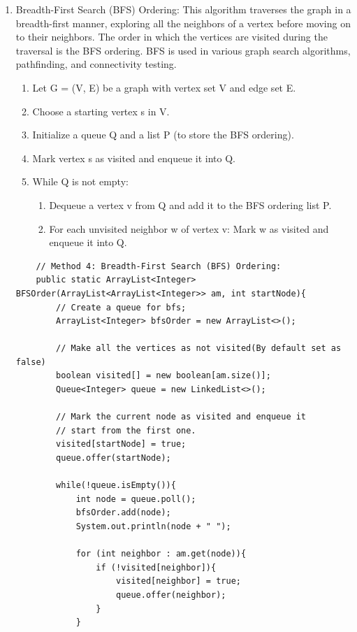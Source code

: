 \documentclass{article}
\begin{document}
\begin{enumerate}
\item Breadth-First Search (BFS) Ordering: This algorithm traverses the graph in a breadth-first manner, exploring all the neighbors of a vertex before moving on to their neighbors. The order in which the vertices are visited during the traversal is the BFS ordering. BFS is used in various graph search algorithms, pathfinding, and connectivity testing.\cite{BFS}
\begin{enumerate}
    \item Let G = (V, E) be a graph with vertex set V and edge set E.
\item Choose a starting vertex s in V.
\item Initialize a queue Q and a list P (to store the BFS ordering).
\item Mark vertex s as visited and enqueue it into Q.
\item While Q is not empty:
\begin{enumerate}
    \item Dequeue a vertex v from Q and add it to the BFS ordering list P.
    \item For each unvisited neighbor w of vertex v: Mark w as visited and enqueue it into Q.
\end{enumerate}


\end{enumerate}
    \begin{verbatim}
    // Method 4: Breadth-First Search (BFS) Ordering:
    public static ArrayList<Integer> BFSOrder(ArrayList<ArrayList<Integer>> am, int startNode){
        // Create a queue for bfs;
        ArrayList<Integer> bfsOrder = new ArrayList<>();

        // Make all the vertices as not visited(By default set as false)
        boolean visited[] = new boolean[am.size()];
        Queue<Integer> queue = new LinkedList<>();

        // Mark the current node as visited and enqueue it
        // start from the first one.
        visited[startNode] = true;
        queue.offer(startNode);

        while(!queue.isEmpty()){
            int node = queue.poll();
            bfsOrder.add(node);
            System.out.println(node + " ");

            for (int neighbor : am.get(node)){
                if (!visited[neighbor]){
                    visited[neighbor] = true;
                    queue.offer(neighbor);
                }
            }


\end{verbatim}
\end{enumerate}
\end{document}
